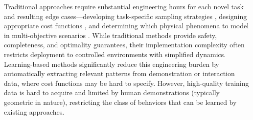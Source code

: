 Traditional approaches require substantial engineering hours for each novel task and resulting edge cases---developing task-specific sampling strategies \cite{abderezaei2024clutter}, designing appropriate cost functions \cite{pasricha2024virtues}, and determining which physical phenomena to model in multi-objective scenarios \cite{pasricha2022pokerrt}. While traditional methods provide safety, completeness, and optimality guarantees, their implementation complexity often restricts deployment to controlled environments with simplified dynamics.
Learning-based methods significantly reduce this engineering burden by automatically extracting relevant patterns from demonstration or interaction data, where cost functions may be hard to specify.
However, high-quality training data is hard to acquire and limited by human demonstrations (typically geometric in nature), restricting the class of behaviors that can be learned by existing approaches.



